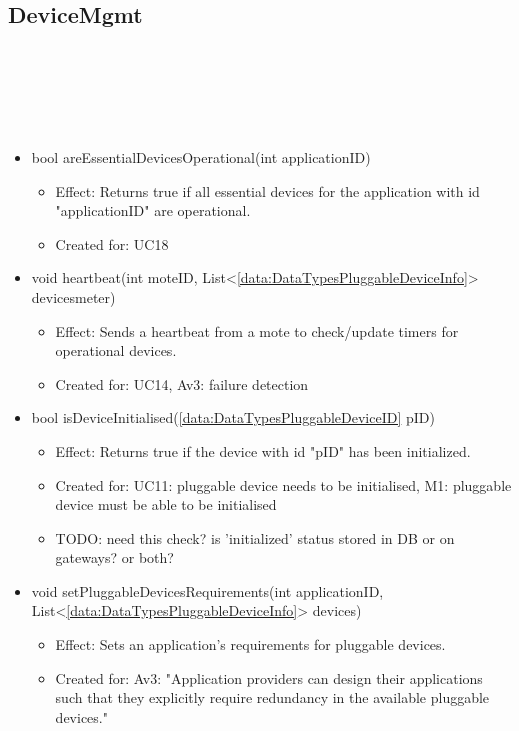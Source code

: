   \subsection{DeviceMgmt}\label{int:GatewayGatewayDeviceManagerDeviceMgmt}
    \begin{description}
      \item[Provided by:] \iconcomponent{}~
      \item[Required by:] \iconcomponent{}~
      \item[Operations:] ~
    \begin{itemize}[noitemsep,nolistsep,leftmargin=-.25cm]
      \item \textsf{bool areEssentialDevicesOperational(int applicationID)}
        \begin{itemize}[noitemsep,nolistsep]
           \item Effect: Returns true if all essential devices for the application with id "applicationID" are operational.
\item Created for: UC18
        \end{itemize}
      \item \textsf{void heartbeat(int moteID, List\textless{}\ref{data:DataTypesPluggableDeviceInfo}\textgreater{} devicesmeter)}
        \begin{itemize}[noitemsep,nolistsep]
           \item Effect: Sends a heartbeat from a mote to check/update timers for operational devices.
\item Created for: UC14, Av3: failure detection
        \end{itemize}
      \item \textsf{bool isDeviceInitialised(\ref{data:DataTypesPluggableDeviceID} pID)}
        \begin{itemize}[noitemsep,nolistsep]
           \item Effect: Returns true if the device with id "pID" has been initialized.
\item Created for: UC11: pluggable device needs to be initialised, M1: pluggable device must be able to be initialised
\item TODO: need this check? is 'initialized' status stored in DB or on gateways? or both?
        \end{itemize}
      \item \textsf{void setPluggableDevicesRequirements(int applicationID, List\textless{}\ref{data:DataTypesPluggableDeviceInfo}\textgreater{} devices)}
        \begin{itemize}[noitemsep,nolistsep]
           \item Effect: Sets an application's requirements for pluggable devices.
\item Created for: Av3: "Application providers can design their applications such that they explicitly require redundancy in the available pluggable devices."
        \end{itemize}
    \end{itemize}
    \end{description}

